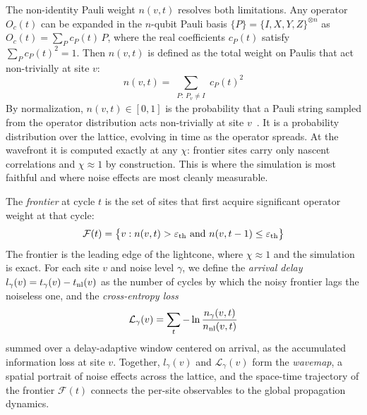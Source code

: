 \documentclass[12pt]{article}
\begin{document}
The non-identity Pauli weight $n(v,t)$ resolves both limitations.
Any operator $O_c(t)$ can be expanded in the $n$-qubit Pauli basis
$\{P\} = \{I,X,Y,Z\}^{\otimes n}$ as $O_c(t) = \sum_P c_P(t)\, P$,
where the real coefficients $c_P(t)$ satisfy $\sum_P c_P(t)^2 = 1$.
Then $n(v,t)$ is defined as the total weight on Paulis that act
non-trivially at site $v$:
\begin{equation}
    n(v,t) = \sum_{\substack{P:\, P_v \neq I}} c_P(t)^2
    \label{eq:nvt}
\end{equation}
By normalization, $n(v,t) \in [0,1]$ is the probability that a Pauli
string sampled from the operator distribution acts non-trivially at site $v$~\cite{nahum2018operator,Tan2025Operator}.
It is a probability distribution over the lattice, evolving in time as the
operator spreads. At the wavefront it is computed exactly at any $\chi$:
frontier sites carry only nascent correlations and $\chi\approx1$ by
construction. This is where the simulation is most faithful and where noise
effects are most cleanly measurable.

The \emph{frontier} at cycle $t$ is the set of sites that first acquire
significant operator weight at that cycle:
\begin{equation}
    \mathcal{F}(t) = \bigl\{ v : n(v,t) > \varepsilon_{\rm th}
                             \text{ and } n(v,t-1) \leq \varepsilon_{\rm th} \bigr\}
    \label{eq:frontier}
\end{equation}
The frontier is the leading edge of the lightcone, where $\chi\approx1$ and
the simulation is exact. For each site $v$ and noise level $\gamma$, we
define the \emph{arrival delay} $l_\gamma(v) = t_\gamma(v) - t_{\rm nl}(v)$
as the number of cycles by which the noisy frontier lags the noiseless one,
and the \emph{cross-entropy loss}
\begin{equation}
    \mathcal{L}_\gamma(v) = \sum_{t} -\ln\frac{n_\gamma(v,t)}{n_{\rm nl}(v,t)}
    \label{eq:loss}
\end{equation}
summed over a delay-adaptive window centered on arrival, as the accumulated
information loss at site $v$.
Together, $l_\gamma(v)$ and $\mathcal{L}_\gamma(v)$ form the \emph{wavemap},
a spatial portrait of noise effects across the lattice, and the
space-time trajectory of the frontier $\mathcal{F}(t)$ connects the
per-site observables to the global propagation dynamics.
\end{document}
